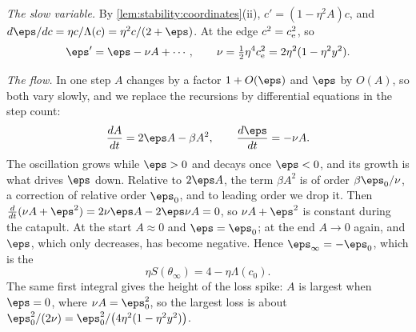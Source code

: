 \begin{refsection}
\begin{heuristic}
\emph{The slow variable.} By \cref{lem:stability:coordinates}(ii), $c'=(1-\eta^2A)c$, and $d\eps/dc=\eta c/\Lambda(c)=\eta^2c/(2+\eps)$. At the edge $c^2=c_{\mathrm{e}}^2$, so
\[
  \eps'=\eps-\nu A+\cdots,\qquad \nu=\tfrac12\eta^4\stabce^2=2\eta^2(1-\eta^2y^2) .
\]

\emph{The flow.} In one step $A$ changes by a factor $1+O(\eps)$ and $\eps$ by $O(A)$, so both vary slowly, and we replace the recursions by differential equations in the step count:
\begin{equation}\label{eq:stability:slowfast}
  \frac{dA}{dt}=2\eps A-\beta A^2,\qquad \frac{d\eps}{dt}=-\nu A .
\end{equation}
The oscillation grows while $\eps>0$ and decays once $\eps<0$, and its growth is what drives $\eps$ down. Relative to $2\eps A$, the term $\beta A^2$ is of order $\beta\eps_0/\nu$, a correction of relative order $\eps_0$, and to leading order we drop it. Then $\frac{d}{dt}(\nu A+\eps^2)=2\nu\eps A-2\eps\nu A=0$, so $\nu A+\eps^2$ is constant during the catapult. At the start $A\approx0$ and $\eps=\eps_0$; at the end $A\to0$ again, and $\eps$, which only decreases, has become negative. Hence $\eps_\infty=-\eps_0$, which is the 
\begin{equation}\label{eq:stability:reflection}
  \eta S(\theta_\infty)=4-\eta\Lambda(c_0).
\end{equation}
The same first integral gives the height of the loss spike: $A$ is largest when $\eps=0$, where $\nu A=\eps_0^2$, so the largest loss is about $\eps_0^2/(2\nu)=\eps_0^2/\bigl(4\eta^2(1-\eta^2y^2)\bigr)$.
\end{heuristic}


\end{refsection}
